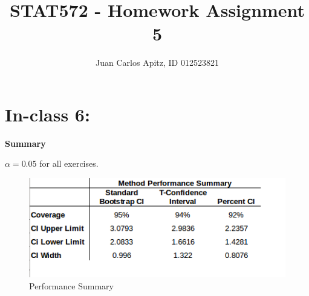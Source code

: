 \documentclass[12pt,a4paper]{article}
\author{Juan Carlos Apitz, ID 012523821}
\title{STAT572 - Homework Assignment 5}
\begin{document}
\maketitle

\section*{In-class 6:}

\textbf{Summary}

$\alpha=0.05$ for all exercises.

\begin{figure}[ht!] 
\begin{center}
\includegraphics[scale=.7]{inClass_summary.png}
\caption{Performance Summary}
\label{inclass6 fig0}
\end{center}
\end{figure}
\FloatBarrier
\end{document}
